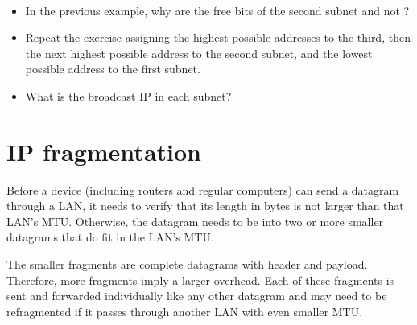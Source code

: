 \begin{exercise}\ \\[-0.5cm]
\begin{itemize}
\item In the previous example, why are the free bits of the second subnet  
and not ?\\[-0.4cm]

\item Repeat the exercise assigning the highest possible addresses to the third,
  then the next highest possible address to the second subnet, 
  and the lowest possible address to the first subnet.\\[-0.4cm]
  
\item What is the broadcast IP in each subnet?
\end{itemize}
\end{exercise}


% 
\section{IP fragmentation}\label{sec:layer3:ip_fragmentation}
\label{sec:layer3:fragmentation}

Before a device (including routers and regular computers)
can send a datagram through a LAN, it needs to verify that its length in bytes 
is not larger than that LAN's MTU. Otherwise, the datagram needs to be 
 into two or more smaller datagrams that do fit in the LAN's MTU.

The smaller fragments are complete datagrams with header and payload. Therefore, 
more fragments imply a larger overhead. Each of these fragments is sent 
and forwarded individually like any other datagram and may need to be refragmented 
if it passes through another LAN with even smaller MTU.

